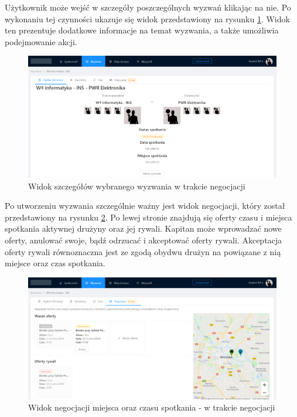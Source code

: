 Użytkownik może wejść w szczegóły poszczególnych wyzwań klikając na nie. Po wykonaniu tej czynności ukazuje się widok przedstawiony na rysunku \ref{fig:ss--match-1}. Widok ten prezentuje dodatkowe informacje na temat wyzwania, a także umożliwia podejmowanie akcji.

\begin{figure}[H]
\centering
\includegraphics[width=\linewidth]{065-dzialanie/rys/ss-match-1.PNG}
\caption{Widok szczegółów wybranego wyzwania w trakcie negocjacji}
\label{fig:ss--match-1}
\end{figure}

Po utworzeniu wyzwania szczególnie ważny jest widok negocjacji, który został przedstawiony na rysunku \ref{fig:ss--match-2}. Po lewej stronie znajdują się oferty czasu i miejsca spotkania aktywnej drużyny oraz jej rywali. Kapitan może wprowadzać nowe oferty, anulować swoje, bądź odrzucać i akceptować oferty rywali. Akceptacja oferty rywali równoznaczna jest ze zgodą obydwu drużyn na powiązane z nią miejsce oraz czas spotkania. 

\begin{figure}[H]
\centering
\includegraphics[width=\linewidth]{065-dzialanie/rys/ss-match-2.PNG}
\caption{Widok negocjacji miejsca oraz czasu spotkania - w trakcie negocjacji}
\label{fig:ss--match-2}
\end{figure}

